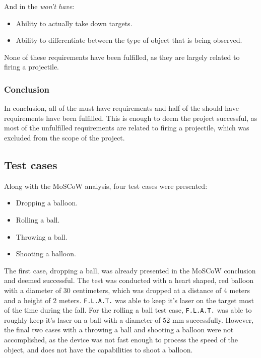 And in the \textit{won't have}:
\begin{itemize}
	\item Ability to actually take down targets.
	\item Ability to differentiate between the type of object that is being observed.
\end{itemize}

None of these requirements have been fulfilled, as they are largely related to firing a projectile.

\subsubsection{Conclusion}
In conclusion, all of the must have requirements and half of the should have requirements have been fulfilled.
This is enough to deem the project successful, as most of the unfulfilled requirements are related to firing a projectile, which was excluded from the scope of the project. 

\subsection{Test cases}
Along with the MoSCoW analysis, four test cases were presented: 
\begin{itemize}
    \item Dropping a balloon.
    \item Rolling a ball.
    \item Throwing a ball.
    \item Shooting a balloon.
\end{itemize}

The first case, dropping a ball, was already presented in the MoSCoW conclusion and deemed successful.
The test was conducted with a heart shaped, red balloon with a diameter of 30 centimeters, which was dropped at a distance of 4 meters and a height of 2 meters. 
\texttt{F.L.A.T.} was able to keep it's laser on the target most of the time during the fall. 
For the rolling a ball test case, \texttt{F.L.A.T.} was able to roughly keep it's laser on a ball with a diameter of 52 mm successfully. 
However, the final two cases with a throwing a ball and shooting a balloon were not accomplished, as the device was not fast enough to process the speed of the object, and does not have the capabilities to shoot a balloon.

